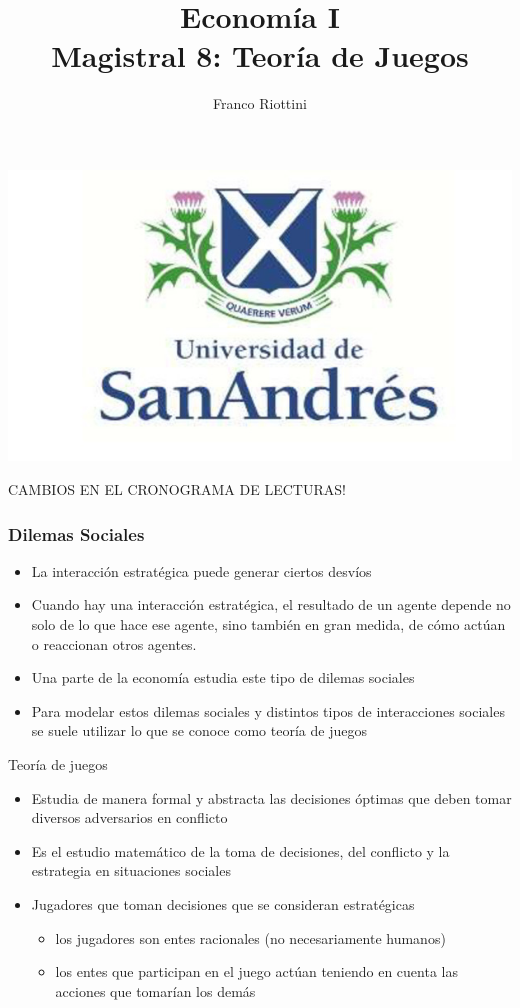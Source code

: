 \documentclass{beamer}
\title[Economía I]{Economía I \vspace{4mm}
\\ Magistral 8: Teoría de Juegos}
\date{}
\author[Riottini]{Franco Riottini}
\institute[]{Universidad de San Andrés}
\begin{document}
\begin{frame}
\titlepage
\centering
\includegraphics[scale=0.2]{../Figures/logoUDESA.jpg} 
\end{frame}

\begin{frame}
    \begin{boxA}
        \centering
        CAMBIOS EN EL CRONOGRAMA DE LECTURAS!
    \end{boxA}
\end{frame}

\begin{frame}
\frametitle{Dilemas Sociales}
\begin{itemize}
    \item La interacción estratégica puede generar ciertos desvíos
    \item Cuando hay una interacción estratégica, el resultado de un agente
    depende no solo de lo que hace ese agente, sino también en
    gran medida, de cómo actúan o reaccionan otros agentes.
    \item Una parte de la economía estudia este tipo de dilemas sociales
    \item Para modelar estos dilemas sociales y distintos tipos de interacciones sociales se suele utilizar lo que se conoce como teoría de juegos
    \end{itemize}
\end{frame}

\begin{frame}{Teoría de juegos}
    \begin{itemize}
        \item Estudia de manera formal y abstracta las decisiones óptimas que deben tomar diversos adversarios en conflicto
        \item Es el estudio matemático de la toma de decisiones, del conflicto y la estrategia en situaciones sociales
        \item Jugadores que toman decisiones que se consideran estratégicas
        \begin{itemize}
            \item los jugadores son entes racionales (no necesariamente humanos)
            \item los entes que participan en el juego actúan teniendo en cuenta las acciones que tomarían los demás
        \end{itemize}
    \end{itemize}
\end{frame}
\end{document}
